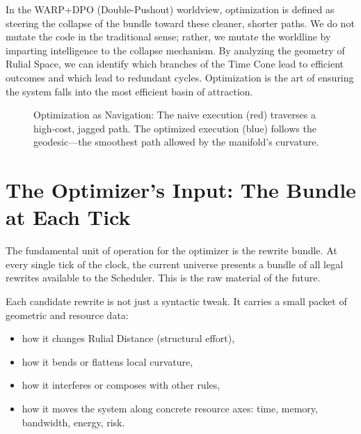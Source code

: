 In the WARP+DPO (Double-Pushout) worldview, optimization is defined as steering the collapse of the bundle toward these cleaner, shorter paths. We do not mutate the code in the traditional sense; rather, we mutate the worldline by imparting intelligence to the collapse mechanism. By analyzing the geometry of Rulial Space, we can identify which branches of the Time Cone lead to efficient outcomes and which lead to redundant cycles. Optimization is the art of ensuring the system falls into the most efficient basin of attraction.

\begin{figure}[h]
\centering
{}
\caption{Optimization as Navigation: The naive execution (red) traverses a high-cost, jagged path. The optimized execution (blue) follows the geodesic—the smoothest path allowed by the manifold's curvature.}
\end{figure}

\section{The Optimizer's Input: The Bundle at Each Tick}
\label{the-optimizers-input-the-bundle-at-each-tick}

The fundamental unit of operation for the optimizer is the rewrite bundle. At every single tick of the clock, the current universe presents a bundle of all legal rewrites available to the Scheduler. This is the raw material of the future.

Each candidate rewrite is not just a syntactic tweak. It carries a small packet of geometric and resource data:

\begin{itemize}
  \item how it changes Rulial Distance (structural effort),
  \item how it bends or flattens local curvature,
  \item how it interferes or composes with other rules,
  \item how it moves the system along concrete resource axes: time, memory, bandwidth, energy, risk.
\end{itemize}


